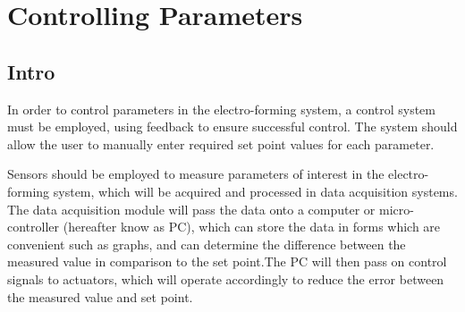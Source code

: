 \section{Controlling Parameters}
\subsection{Intro}
In order to control parameters in the electro-forming system, a control system must be employed, using feedback to ensure successful control. The system should allow the user to manually enter required set point values for each parameter.

Sensors should be employed to measure parameters of interest in the electro-forming system, which will be acquired and processed in data acquisition systems. The data acquisition module will pass the data onto a computer or micro-controller (hereafter know as PC), which can store the data in forms which are convenient such as graphs, and can determine the difference between the measured value in comparison to the set point.The PC will then pass on control signals to actuators, which will operate accordingly to reduce the error between the measured value and set point. 
